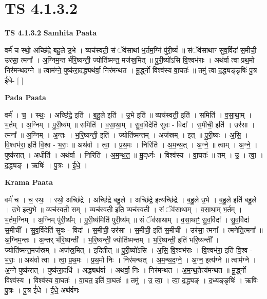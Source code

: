 \documentclass[17pt]{extarticle}
\begin{document}
\section{ TS 4.1.3.2 }

\textbf{TS 4.1.3.2 } \newline
\textbf{Samhita Paata} \newline

वर्म॑ च स्थो॒ अच्छि॑द्रे बहु॒ले उ॒भे । व्यच॑स्वती॒ सं ॅव॑साथां भ॒र्तम॒ग्निं पु॑री॒ष्यं᳚ ॥ संॅव॑साथाꣳ सुव॒र्विदा॑ स॒मीची॒ उर॑सा॒ त्मना᳚ । अ॒ग्निम॒न्त र्भ॑रि॒ष्यन्ती॒ ज्योति॑ष्मन्त॒ मज॑स्र॒मित् ॥ पु॒री॒ष्यो॑ऽसि वि॒श्वभ॑राः । अथ॑र्वा त्वा प्रथ॒मो निर॑मन्थदग्ने ॥ त्वाम॑ग्ने॒ पुष्क॑रा॒दद्ध्यथ॑र्वा॒ निर॑मन्थत । मू॒र्द्ध्नो विश्व॑स्य वा॒घतः॑ ॥ तमु॑ त्वा द॒द्ध्यङ्ङृषिः॑ पु॒त्र ई॑धे॒- [  ] \newline

\textbf{Pada Paata} \newline

वर्म॑ । च॒ । स्थः॒ । अच्छि॑द्रे॒ इति॑ । ब॒हु॒ले इति॑ । उ॒भे इति॑ ॥ व्यच॑स्वती॒ इति॑ । समिति॑ । व॒सा॒था॒म् । भ॒र्तम् । अ॒ग्निम् । पु॒री॒ष्य᳚म् ॥ समिति॑ । व॒सा॒था॒म् । सु॒व॒र्विदेति॑ सुवः - विदा᳚ । स॒मीची॒ इति॑ । उर॑सा । त्मना᳚ ॥ अ॒ग्निम् । अ॒न्तः । भ॒रि॒ष्यन्ती॒ इति॑ । ज्योति॑ष्मन्तम् । अज॑स्रम् । इत् ॥ पु॒री॒ष्यः॑ । अ॒सि॒ । वि॒श्वभ॑रा॒ इति॑ वि॒श्व - भ॒राः॒ ॥ अथ॑र्वा । त्वा॒ । प्र॒थ॒मः । निरिति॑ । अ॒म॒न्थ॒त् । अ॒ग्ने॒ ॥ त्वाम् । अ॒ग्ने॒ । पुष्क॑रात् । अधीति॑ । अथ॑र्वा । निरिति॑ । अ॒म॒न्थ॒त॒ ॥ मू॒द्‌र्ध्नः । विश्व॑स्य । वा॒घतः॑ ॥ तम् । उ॒ । त्वा॒ । द॒द्ध्यङ् । ऋषिः॑ । पु॒त्रः । ई॒धे॒ ।  \newline


\textbf{Krama Paata} \newline

वर्म॑ च । च॒ स्थः॒ । स्थो॒ अच्छि॑द्रे । अच्छि॑द्रे बहु॒ले । अच्छि॑द्रे॒ इत्यच्छि॑द्रे । ब॒हु॒ले उ॒भे । ब॒हु॒ले इति॑ बहु॒ले । उ॒भे इत्यु॒भे ॥ व्यच॑स्वती॒ सम् । व्यच॑स्वती॒ इति॒ व्यच॑स्वती । सं ॅव॑साथाम् । व॒सा॒था॒म् भ॒र्तम् । भ॒र्तम॒ग्निम् । अ॒ग्निम् पु॑री॒ष्य᳚म् । पु॒री॒ष्य॑मिति॑ पुरी॒ष्य᳚म् ॥ सं ॅव॑साथाम् । व॒सा॒थाꣳ॒॒ सु॒व॒र्विदा᳚ । सु॒व॒र्विदा॑ स॒मीची᳚ । सु॒व॒र्विदेति॑ सुवः - विदा᳚ । स॒मीची॒ उर॑सा । स॒मीची॒ इति॑ स॒मीची᳚ । उर॑सा॒ त्मना᳚ । त्मनेति॒त्मना᳚ ॥ अ॒ग्निम॒न्तः । अ॒न्तर् भ॑रि॒ष्यन्ती᳚ । भ॒रि॒ष्यन्ती॒ ज्योति॑ष्मन्तम् । भ॒रि॒ष्यन्ती॒ इति॑ भरि॒ष्यन्ती᳚ । ज्योति॑ष्मन्त॒मज॑स्रम् । अज॑स्र॒मित् । इदितीत् ॥ पु॒री॒ष्यो॑ऽसि । अ॒सि॒ वि॒श्वभ॑राः । वि॒श्वभ॑रा॒ इति॑ वि॒श्व - भ॒राः॒ ॥ अथ॑र्वा त्वा । त्वा॒ प्र॒थ॒मः । प्र॒थ॒मो निः । निर॑मन्थत् । अ॒म॒न्थ॒द॒ग्ने॒ । अ॒ग्न॒ इत्य॑ग्ने ॥ त्वाम॑ग्ने । अ॒ग्ने पुष्क॑रात् । पुष्क॑रा॒दधि॑ । अद्ध्यथ॑र्वा । अथ॑र्वा॒ निः । निर॑मन्थत । अ॒म॒न्थ॒तेत्य॑मन्थत ॥ मू॒र्द्ध्नो विश्व॑स्य । विश्व॑स्य वा॒घतः॑ । वा॒घत॒ इति॑ वा॒घतः॑ ॥ तमु॑ । उ॒ त्वा॒ । त्वा॒ द॒द्ध्यङ् । द॒ध्यङ्ङृषिः॑ । ऋषिः॑ पु॒त्रः । पु॒त्र ई॑धे । 
ई॒धे॒ अथ॑र्वणः \newline
\end{document}
